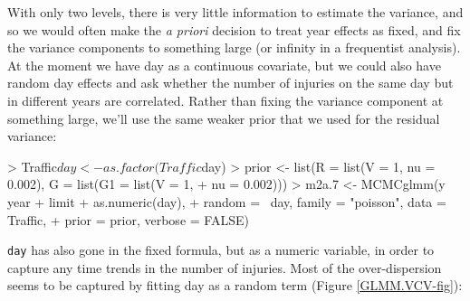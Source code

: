 \documentclass{article}
\begin{document}
With only two levels, there is very little information to estimate the variance, and so we would often make the \emph{a priori} decision to treat year effects as fixed, and fix the variance components to something large (or infinity in a frequentist analysis).\\

At the moment we have day as a continuous covariate, but we could also have random day effects and ask whether the number of injuries on the same day but in different years are correlated. Rather than fixing the variance component at something large, we'll use the same weaker prior that we used for the residual variance:

\begin{Schunk}
\begin{Sinput}
> Traffic$day <- as.factor(Traffic$day)
> prior <- list(R = list(V = 1, nu = 0.002), G = list(G1 = list(V = 1, 
+     nu = 0.002)))
> m2a.7 <- MCMCglmm(y ~ year + limit + as.numeric(day), 
+     random = ~day, family = "poisson", data = Traffic, 
+     prior = prior, verbose = FALSE)
\end{Sinput}
\end{Schunk}

\texttt{day} has also gone in the fixed formula, but as a numeric variable, in order to capture any time trends in the number of injuries. Most of the over-dispersion seems to be captured by fitting day as a random term (Figure \ref{GLMM.VCV-fig}):

\begin{Schunk}
\end{Schunk}
\end{document}
